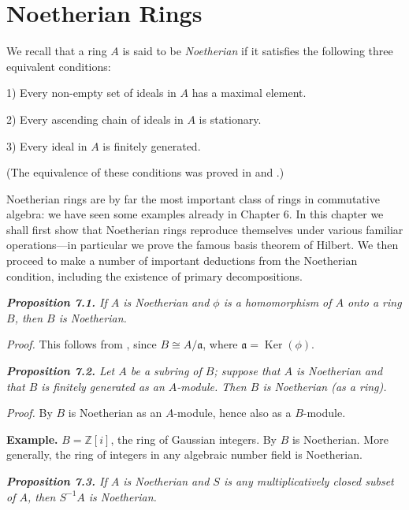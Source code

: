 
\section{Noetherian Rings}

We recall that a ring $A$ is said to be \emph{Noetherian} if it satisfies the following three
equivalent conditions:

1) Every non-empty set of ideals in $A$ has a maximal element.

2) Every ascending chain of ideals in $A$ is stationary.

3) Every ideal in $A$ is finitely generated.

(The equivalence of these conditions was proved in  and .)

Noetherian rings are by far the most important class of rings in commutative
algebra: we have seen some examples already in Chapter 6.  In this chapter we
shall first show that Noetherian rings reproduce themselves under various
familiar operations---in particular we prove the famous basis theorem of Hilbert.
We then proceed to make a number of important deductions from the
Noetherian condition, including the existence of primary decompositions.

\medskip
\noindent\textit{\textbf{Proposition 7.1.} If $A$ is Noetherian and $\phi$ is a homomorphism of $A$ onto a
ring $B$, then $B$ is Noetherian.}

\noindent\emph{Proof.}  This follows from , since $B\cong A/\mathfrak a$, where $\mathfrak a=\operatorname{Ker}(\phi)$.\proofbox

\medskip
\noindent\textit{\textbf{Proposition 7.2.} Let $A$ be a subring of $B$; suppose that $A$ is Noetherian and
that $B$ is finitely generated as an $A$-module.  Then $B$ is Noetherian (as a ring).}

\noindent\emph{Proof.}  By  $B$ is Noetherian as an $A$-module, hence also as a $B$-module.\proofbox

\noindent\textbf{Example.}  $B=\mathbb Z[i]$, the ring of Gaussian integers.  By  $B$ is Noetherian.
More generally, the ring of integers in any algebraic number field is Noetherian.

\medskip
\noindent\textit{\textbf{Proposition 7.3.} If $A$ is Noetherian and $S$ is any multiplicatively closed
subset of $A$, then $S^{-1}A$ is Noetherian.}

